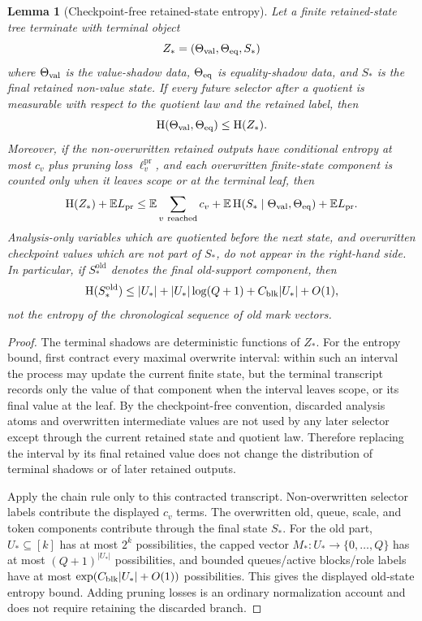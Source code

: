 \documentclass[11pt]{article}
\newtheorem{lemma}[theorem]{Lemma}
\theoremstyle{remark}
\newcommand{\E}{\mathbb E}
\newcommand{\HH}{\mathrm H}
\newcommand{\pr}{\mathrm{pr}}
\newcommand{\old}{\mathrm{old}}
\begin{document}
\begin{lemma}[Checkpoint-free retained-state entropy]\label{lem:retained-entropy}
Let a finite retained-state tree terminate with terminal object
\[
        Z_*=(\Theta_{\rm val},\Theta_{\rm eq},S_*)
\]
where $\Theta_{\rm val}$ is the value-shadow data, $\Theta_{\rm eq}$ is equality-shadow data, and $S_*$ is the final retained non-value state.  If every future selector after a quotient is measurable with respect to the quotient law and the retained label, then
\[
        \HH(\Theta_{\rm val},\Theta_{\rm eq})\le \HH(Z_*).
\]
Moreover, if the non-overwritten retained outputs have conditional entropy at most $c_v$ plus pruning loss $\ell^{\pr}_v$, and each overwritten finite-state component is counted only when it leaves scope or at the terminal leaf, then
\[
        \HH(Z_*)+\E L_{\pr}
        \le
        \E\sum_{v\ {\rm reached}} c_v
        +\E\,\HH(S_*\mid \Theta_{\rm val},\Theta_{\rm eq})
        +\E L_{\pr}.
\]
Analysis-only variables which are quotiented before the next state, and overwritten checkpoint values which are not part of $S_*$, do not appear in the right-hand side.  In particular, if $S_*^{\old}$ denotes the final old-support component, then
\[
        \HH(S_*^{\old})
        \le |U_*|+|U_*|\log(Q+1)+C_{\rm blk}|U_*|+O(1),
\]
not the entropy of the chronological sequence of old mark vectors.
\end{lemma}

\begin{proof}
The terminal shadows are deterministic functions of $Z_*$.  For the entropy bound, first contract every maximal overwrite interval: within such an interval the process may update the current finite state, but the terminal transcript records only the value of that component when the interval leaves scope, or its final value at the leaf.  By the checkpoint-free convention, discarded analysis atoms and overwritten intermediate values are not used by any later selector except through the current retained state and quotient law.  Therefore replacing the interval by its final retained value does not change the distribution of terminal shadows or of later retained outputs.

Apply the chain rule only to this contracted transcript.  Non-overwritten selector labels contribute the displayed $c_v$ terms.  The overwritten old, queue, scale, and token components contribute through the final state $S_*$.  For the old part, $U_*\subseteq[k]$ has at most $2^k$ possibilities, the capped vector $M_*:U_*\to\{0,\ldots,Q\}$ has at most $(Q+1)^{|U_*|}$ possibilities, and bounded queues/active blocks/role labels have at most $\exp(C_{\rm blk}|U_*|+O(1))$ possibilities.  This gives the displayed old-state entropy bound.  Adding pruning losses is an ordinary normalization account and does not require retaining the discarded branch.

\end{proof}
\end{document}
